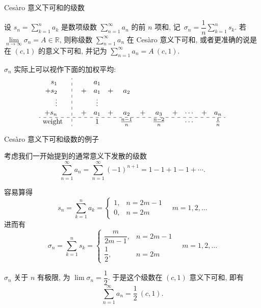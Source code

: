 \begin{frame}{Cesàro 意义下可和的级数}

\begin{Def}
设 $s_n = \sum\limits_{k=1}^{n} a_k$ 是数项级数 $\sum\limits_{n=1}^{\infty} a_n$ 的前 $n$ 项和, 记~{\color{red}$\sigma_n = \dfrac{1}{n} \sum\limits_{k=1}^{n} s_k$}. 若~{\color{red}$\lim\limits_{n\to\infty} \sigma_n = A \in \mathbb{R}$}, 则称级数 $\sum\limits_{n=1}^{\infty} a_n$ 在 Cesàro 意义下可和, 或者更准确的说是在 $(c, 1)$ 的意义下可和, 并记为 $\sum\limits_{n=1}^{\infty} a_n = A~(c, 1).$
\end{Def}

\pause

$\sigma_n$ 实际上可以视作下面的加权平均:
\[
\begin{array}{r:cccccccccc}
  s_1 \phantom{++} & & a_1 \\
+ s_2 \phantom{++} & \phantom{+} + & a_1 & + & a_2 \\
\vdots \phantom{++} & & \vdots \\
+ s_n \phantom{++} & \phantom{+} + & a_1 & + & a_2 & + & a_3 & + & \cdots & + & a_n \\
\hdashline
\text{weight} \phantom{+} & & 1 & & \frac{n-1}{n} & & \frac{n-2}{n} & & \cdots & & \frac{1}{n}
\end{array}
\]

\end{frame}


\begin{frame}{Cesàro 意义下可和级数的例子}

考虑我们一开始提到的通常意义下发散的级数
\[\sum\limits_{n=1}^{\infty} a_n = \sum\limits_{n=1}^{\infty} (-1)^{n+1}  = 1 - 1 + 1 - 1 + \cdots.\]

\pause

容易算得
\[
s_n = \sum\limits_{k=1}^{n} a_k = \begin{cases}
1, & n = 2m - 1 \\
0, & n = 2m
\end{cases} \quad m = 1, 2, \dots
\]
进而有
\[
\sigma_n = \sum\limits_{k=1}^n s_k = \begin{cases}
\dfrac{m}{2m - 1}, & n = 2m - 1\\
\dfrac{1}{2}, & n = 2m
\end{cases} \quad m = 1, 2, \dots
\]

\pause

$\sigma_n$ 关于 $n$ 有极限, 为 $\lim\limits \sigma_n = \dfrac{1}{2}.$ 于是这个级数在 $(c, 1)$ 意义下可和, 即有
\[\sum\limits_{n=1}^{\infty} a_n = \dfrac{1}{2}~(c, 1).\]

\end{frame}

